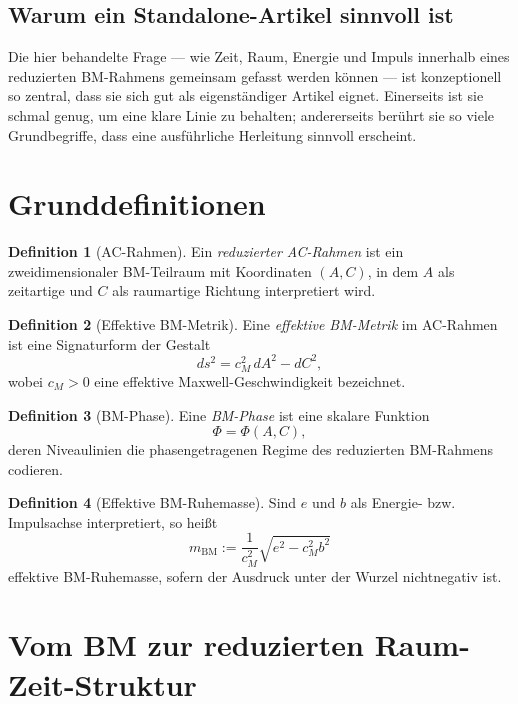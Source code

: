 \documentclass[11pt,a4paper]{article}
\theoremstyle{definition}
\newtheorem{definition}{Definition}[section]
\theoremstyle{plain}
\begin{document}
	\subsection{Warum ein Standalone-Artikel sinnvoll ist}
	
	Die hier behandelte Frage --- wie Zeit, Raum, Energie und Impuls innerhalb eines reduzierten BM-Rahmens gemeinsam gefasst werden können --- ist konzeptionell so zentral, dass sie sich gut als eigenständiger Artikel eignet. Einerseits ist sie schmal genug, um eine klare Linie zu behalten; andererseits berührt sie so viele Grundbegriffe, dass eine ausführliche Herleitung sinnvoll erscheint.
	
	\section{Grunddefinitionen}
	
	\begin{definition}[AC-Rahmen]
		Ein \emph{reduzierter AC-Rahmen} ist ein zweidimensionaler BM-Teilraum mit Koordinaten $(A,C)$, in dem $A$ als zeitartige und $C$ als raumartige Richtung interpretiert wird.
	\end{definition}
	
	\begin{definition}[Effektive BM-Metrik]
		Eine \emph{effektive BM-Metrik} im AC-Rahmen ist eine Signaturform der Gestalt
		\[
		ds^2 = c_M^2\, dA^2 - dC^2,
		\]
		wobei $c_M>0$ eine effektive Maxwell-Geschwindigkeit bezeichnet.
	\end{definition}
	
	\begin{definition}[BM-Phase]
		Eine \emph{BM-Phase} ist eine skalare Funktion
		\[
		\Phi=\Phi(A,C),
		\]
		deren Niveaulinien die phasengetragenen Regime des reduzierten BM-Rahmens codieren.
	\end{definition}
	
	\begin{definition}[Effektive BM-Ruhemasse]
		Sind $e$ und $b$ als Energie- bzw. Impulsachse interpretiert, so heißt
		\[
		m_{\mathrm{BM}}:=\frac{1}{c_M^2}\sqrt{e^2-c_M^2b^2}
		\]
		effektive BM-Ruhemasse, sofern der Ausdruck unter der Wurzel nichtnegativ ist.
	\end{definition}
	
	\section{Vom BM zur reduzierten Raum-Zeit-Struktur}
	
\end{document}
